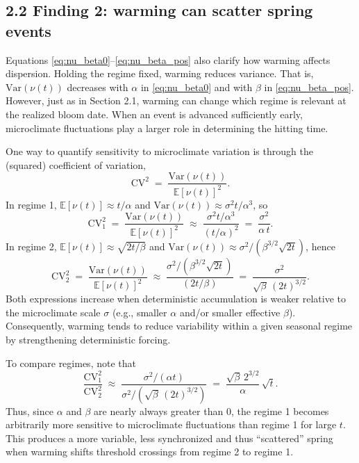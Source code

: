 \subsection{2.2 Finding 2: warming can scatter spring
events}\label{finding-2-warming-can-scatter-spring-events}

Equations \eqref{eq:nu_beta0}--\eqref{eq:nu_beta_pos} also clarify how
warming affects dispersion. Holding the regime fixed, warming reduces
variance. That is, \(\mathrm{Var}(\nu(t))\) decreases with \(\alpha\) in
\eqref{eq:nu_beta0} and with \(\beta\) in \eqref{eq:nu_beta_pos}.
However, just as in Section 2.1, warming can change which regime is
relevant at the realized bloom date. When an event is advanced
sufficiently early, microclimate fluctuations play a larger role in
determining the hitting time.

One way to quantify sensitivity to microclimate variation is through the
(squared) coefficient of variation, \[
\mathrm{CV}^2 \;=\; \frac{\mathrm{Var}(\nu(t))}{\mathbb{E}[\nu(t)]^2}.
\] In regime 1, \(\mathbb{E}[\nu(t)]\approx t/\alpha\) and
\(\mathrm{Var}(\nu(t))\approx \sigma^2 t/\alpha^3\), so
\begin{equation*}
\mathrm{CV}^2_{1}
\;=\;
\frac{\mathrm{Var}(\nu(t))}{\mathbb{E}[\nu(t)]^2}
\;\approx\;
\frac{\sigma^2 t/\alpha^3}{(t/\alpha)^2}
\;=\;
\frac{\sigma^2}{\alpha\,t}.
\end{equation*} In regime 2,
\(\mathbb{E}[\nu(t)]\approx \sqrt{2t/\beta}\) and
\(\mathrm{Var}(\nu(t))\approx \sigma^2/(\beta^{3/2}\sqrt{2t})\), hence
\begin{equation*}
\mathrm{CV}^2_{2}
\;=\;
\frac{\mathrm{Var}(\nu(t))}{\mathbb{E}[\nu(t)]^2}
\;\approx\;
\frac{\sigma^2/(\beta^{3/2}\sqrt{2t})}{(2t/\beta)}
\;=\;
\frac{\sigma^2}{\sqrt{\beta} \, (2t)^{3/2}}.
\end{equation*} Both expressions increase when deterministic
accumulation is weaker relative to the microclimate scale \(\sigma\)
(e.g., smaller \(\alpha\) and/or smaller effective \(\beta\)).
Consequently, warming tends to reduce variability within a given
seasonal regime by strengthening deterministic forcing.

To compare regimes, note that \begin{equation*}
\frac{\mathrm{CV}^2_{1}}{\mathrm{CV}^2_{2}}
\;\approx\;
\frac{\sigma^2/(\alpha t)}{\sigma^2/(\sqrt{\beta} \, (2t)^{3/2})}
\;=\;
\frac{\sqrt{\beta} \, 2^{3/2}}{\alpha}\,\sqrt{t}.
\end{equation*} Thus, since \(\alpha\) and \(\beta\) are nearly always
greater than \(0\), the regime 1 becomes arbitrarily more sensitive to
microclimate fluctuations than regime 1 for large \(t\). This produces a
more variable, less synchronized and thus ``scattered'' spring when
warming shifts threshold crossings from regime 2 to regime 1.

